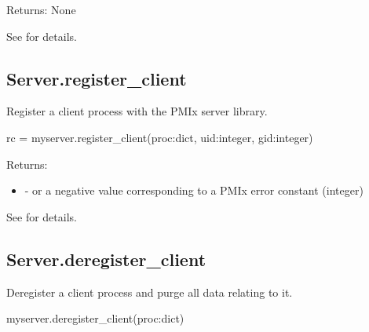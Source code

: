 \begin{arglist}
\end{arglist}

Returns: None

See  for details.


\subsection{Server.register_client}

\summary
Register a client process with the PMIx server library.

\format

\pyspecificstart
\begin{codepar}
rc = myserver.register_client(proc:dict, uid:integer, gid:integer)
\end{codepar}
\pyspecificend


\begin{arglist}
\end{arglist}

Returns:

\begin{itemize}
    \item {} -  or a negative value corresponding to a PMIx error constant (integer)
\end{itemize}

See  for details.


\subsection{Server.deregister_client}

\summary
Deregister a client process and purge all data relating to it.


\format

\pyspecificstart
\begin{codepar}
myserver.deregister_client(proc:dict)
\end{codepar}
\pyspecificend


